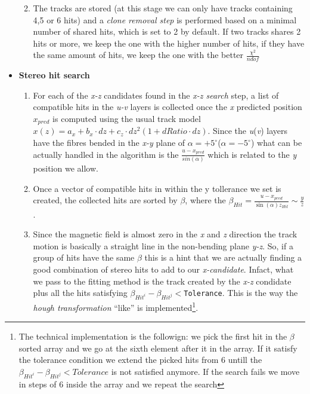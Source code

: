\documentclass[paper=a4, fontsize=10pt]{scrartcl}
\numberwithin{equation}{section}		%
\numberwithin{figure}{section}			%
\numberwithin{table}{section}				%
\begin{document}
\begin{itemize}
\begin{enumerate}
\begin{enumerate}
           \end{enumerate}
      \item{The tracks are stored (at this stage we can only have tracks containing 4,5 or 6 hits) and a \textit{clone removal step} is performed based on a minimal number of shared hits, which is set to 2 by default. If two tracks shares 2 hits or more, we keep the one with the higher number of hits, if they have the same amount of hits, we keep the one with the better $\frac{\chi^{2}}{ndof}$}
   \end{enumerate}
 \item{\textbf{Stereo hit search}}
  \begin{enumerate}
   \item{For each of the \textit{x-z} candidates found in the \textit{x-z search} step, a list of compatible hits in the \textit{u-v} layers is collected once the \textit{x} predicted position $x_{pred}$ is computed using the usual track model $x(z)=a_x + b_x \cdot dz +c_z \cdot dz^{2}\left( 1+dRatio \cdot dz \right)$. Since the \textit{u}(\textit{v}) layers have the fibres bended in the \textit{x-y} plane of $\alpha = +5^{\circ}$($\alpha = -5^{\circ}$) what can be actually handled in the algorithm is the $\frac{u - x_{pred}}{sin(\alpha)}$ which is related to the \textit{y} position we allow.}
   \item{Once a vector of compatible hits in within the y tollerance we set is created, the collected hits are sorted by $\beta$, where the $\beta_{Hit}=\frac{u-x_{pred}}{\sin(\alpha)z_{Hit}}\sim \frac{y}{z}$.}
   \item{Since the magnetic field is almost zero in the \textit{x} and \textit{z} direction the track motion is basically a straight line in the non-bending plane \textit{y-z}. So, if a group of hits have the same $\beta$ this is a hint that we are actually finding a good combination of stereo hits to add to our \textit{x-candidate}. Infact, what we pass to the fitting method is the track created by the \textit{x-z} condidate plus all the hits satisfying $\beta_{Hit^{i}}-\beta_{Hit^{j}}<$\texttt{Tolerance}. This is the way the \textit{hough transformation} ``like'' is implemented\footnote{The technical implementation is the followign: we pick the first hit in the $\beta$ sorted array and we go at the sixth element after it in the array. If it satisfy the tolerance condition we extend the picked hits from 6 untill the $\beta_{Hit^{i}}-\beta_{Hit^{j}}<Tolerance$ is not satisfied anymore. If the search fails we move in steps of 6 inside the array and we repeat the search}.}

\end{enumerate}
\end{itemize}
\end{document}
